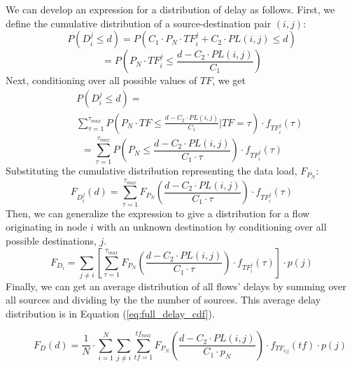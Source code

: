 We can develop an expression for a distribution of delay as follows.  First, we define the cumulative distribution of a source-destination pair $(i,j)$:
\begin{equation*}
	P( D_{i}^{j} \leq d ) = P( C_1 \cdot P_N \cdot TF_{i}^{j} + C_2 \cdot PL(i,j) \leq d )
\end{equation*}
\begin{equation*}
	= P( P_N \cdot TF_{i}^{j} \leq \frac{d - C_2 \cdot PL(i,j)}{C_1}  )
\end{equation*}
Next, conditioning over all possible values of $TF$, we get
\begin{eqnarray*}
	&&P( D_{i}^{j} \leq d ) = \\
	&&\sum\limits_{\tau = 1}^{\tau_{max}} P( P_N \cdot TF \leq \frac{d - C_2 \cdot PL(i,j)}{C_1} | TF = \tau ) \cdot f_{TF_{i}^{j}}(\tau)
\end{eqnarray*}
\begin{equation*}
	= \sum\limits_{\tau = 1}^{\tau_{max}} P( P_N \leq \frac{d - C_2 \cdot PL(i,j)}{C_1 \cdot \tau} ) \cdot f_{TF_{i}^{j}}(\tau)
\end{equation*}
Substituting the cumulative distribution representing the data load, $F_{P_{N}}$:
\begin{equation*}
	F_{D_{i}^{j}}(d) = \sum\limits_{\tau = 1}^{\tau_{max}} F_{P_N}( \frac{d - C_2 \cdot PL(i,j)}{C_1 \cdot \tau} ) \cdot f_{TF_{i}^{j}}(\tau)
\end{equation*}
Then, we can generalize the expression to give a distribution for a flow originating in node $i$ with an unknown destination by conditioning over all possible destinations, $j$.
\begin{equation}
\label{eq:delay_dist_pdf_i}
	F_{D_i} = \sum\limits_{j \neq i} [ \sum\limits_{\tau = 1}^{\tau_{max}} F_{P_N}( \frac{d - C_2 \cdot PL(i,j)}{C_1 \cdot \tau} ) \cdot f_{TF_{i}^{j}}(\tau) ] \cdot p(j)
\end{equation}
Finally, we can get an average distribution of all flows' delays by summing over all sources and dividing by the the number of sources.  This average delay distribution is in Equation (\ref{eq:full_delay_cdf}).

\begin{figure}[!t]
\begin{equation}
\label{eq:full_delay_cdf}
	F_D(d) = \frac{1}{N} \cdot \sum\limits_{i = 1}^N \sum\limits_{j \neq i} \sum\limits_{tf=1}^{tf_{max}}  F_{P_N}( \frac{d - C_2 \cdot PL(i,j)}{C_1 \cdot p_N} ) \cdot f_{TF_{i | j}}( tf ) \cdot p(j)
\end{equation}
\end{figure}

